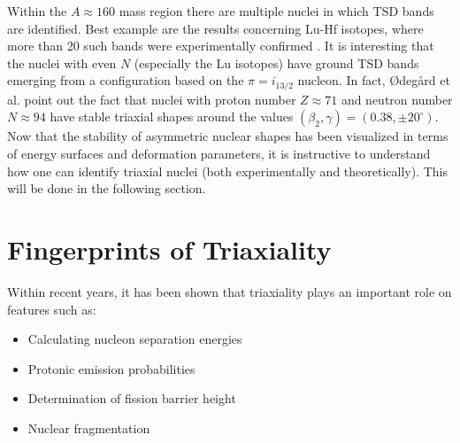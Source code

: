 Within the $A\approx160$ mass region there are multiple nuclei in which TSD bands are identified. Best example are the results concerning Lu-Hf isotopes, where more than 20 such bands were experimentally confirmed \cite{gu2007theoretical}. It is interesting that the nuclei with even $N$ (especially the Lu isotopes) have ground TSD bands emerging from a configuration based on the $\pi=i_{13/2}$ nucleon. In fact, Ødegård et al. \cite{odegaard2001evidence} point out the fact that nuclei with proton number $Z\approx 71$ and neutron number $N\approx 94$ have stable triaxial shapes around the values $(\beta_2,\gamma)=(0.38,\pm 20^\circ)$.
Now that the stability of asymmetric nuclear shapes has been visualized in terms of energy surfaces and deformation parameters, it is instructive to understand how one can identify triaxial nuclei (both experimentally and theoretically). This will be done in the following section.

\section{Fingerprints of Triaxiality}

Within recent years, it has been shown that triaxiality plays an important role on features such as:
\begin{itemize}
    \item Calculating nucleon separation energies \cite{moller2006global}
    \item Protonic emission probabilities \cite{qi2019recent,budaca2022deformation}
    \item Determination of fission barrier height \cite{moller2009heavy,lu2012potential}
    \item Nuclear fragmentation \cite{palumbo1985splitting}
\end{itemize}

